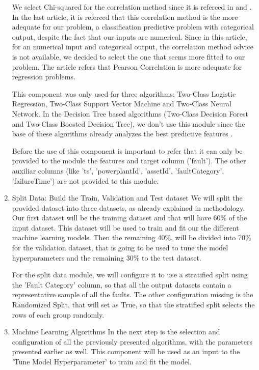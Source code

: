 \begin{enumerate}
We select Chi-squared for the correlation method since it is refereed in \cite{OLD_41_WIND} and \cite{MLMistery_Feature_Selection}. In the last article, it is refereed that this correlation method is the more adequate for our problem, a classification predictive problem with categorical output, despite the fact that our inputs are numerical. Since in this article, for an numerical input and categorical output, the correlation method advice is not available, we decided to select the one that seems more fitted to our problem. The article refers that Pearson Correlation is more adequate for regression problems.

This component was only used for three algorithms: Two-Class Logistic Regression, Two-Class Support Vector Machine and Two-Class Neural Network. In the Decision Tree based algorithms (Two-Class Decision Forest and Two-Class Boosted Decision Tree), we don't use this module since the base of these algorithms already analyzes the best predictive features \cite{TDC_Feature_Selection}.

Before the use of this component is important to refer that it can only be provided to the module the features and target column ('fault'). The other auxiliar columns (like 'ts', 'powerplantId', 'assetId', 'faultCategory', 'failureTime') are not provided to this module.

    \item{Split Data: Build the Train, Validation and Test dataset}
We will split the provided dataset into three datasets, as already explained in methodology. Our first dataset will be the training dataset and that will have 60\% of the input dataset. This dataset will be used to train and fit our the different machine learning models. Then the remaining 40\%, will be divided into 70\% for the validation dataset, that is going to be used to tune the model hyperparameters and the remaining 30\% to the test dataset.

For the split data module, we will configure it to use a stratified split using the 'Fault Category' column, so that all the output datasets contain a representative sample of all the faults. The other configuration missing is the Randomized Split, that will set as True, so that the stratified split selects the rows of each group randomly.

    \item{Machine Learning Algorithms}
In the next step is the selection and configuration of all the previously presented algorithms, with the parameters presented earlier as well. This component will be used as an input to the 'Tune Model Hyperparameter' to train and fit the model.


\end{enumerate}
